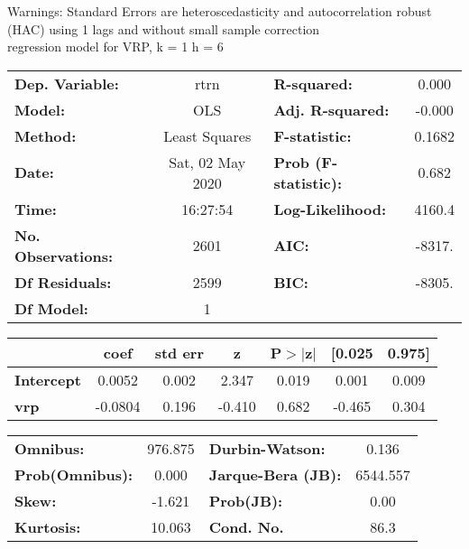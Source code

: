 Warnings: \newline
 [1] Standard Errors are heteroscedasticity and autocorrelation robust (HAC) using 1 lags and without small sample correction\\ 

regression model for VRP, k = 1 h = 6\begin{center}
\begin{tabular}{lclc}
\toprule
\textbf{Dep. Variable:}    &       rtrn       & \textbf{  R-squared:         } &     0.000   \\
\textbf{Model:}            &       OLS        & \textbf{  Adj. R-squared:    } &    -0.000   \\
\textbf{Method:}           &  Least Squares   & \textbf{  F-statistic:       } &    0.1682   \\
\textbf{Date:}             & Sat, 02 May 2020 & \textbf{  Prob (F-statistic):} &    0.682    \\
\textbf{Time:}             &     16:27:54     & \textbf{  Log-Likelihood:    } &    4160.4   \\
\textbf{No. Observations:} &        2601      & \textbf{  AIC:               } &    -8317.   \\
\textbf{Df Residuals:}     &        2599      & \textbf{  BIC:               } &    -8305.   \\
\textbf{Df Model:}         &           1      & \textbf{                     } &             \\
\bottomrule
\end{tabular}
\begin{tabular}{lcccccc}
                   & \textbf{coef} & \textbf{std err} & \textbf{z} & \textbf{P$> |$z$|$} & \textbf{[0.025} & \textbf{0.975]}  \\
\midrule
\textbf{Intercept} &       0.0052  &        0.002     &     2.347  &         0.019        &        0.001    &        0.009     \\
\textbf{vrp}       &      -0.0804  &        0.196     &    -0.410  &         0.682        &       -0.465    &        0.304     \\
\bottomrule
\end{tabular}
\begin{tabular}{lclc}
\textbf{Omnibus:}       & 976.875 & \textbf{  Durbin-Watson:     } &    0.136  \\
\textbf{Prob(Omnibus):} &   0.000 & \textbf{  Jarque-Bera (JB):  } & 6544.557  \\
\textbf{Skew:}          &  -1.621 & \textbf{  Prob(JB):          } &     0.00  \\
\textbf{Kurtosis:}      &  10.063 & \textbf{  Cond. No.          } &     86.3  \\
\bottomrule
\end{tabular}
\end{center}

